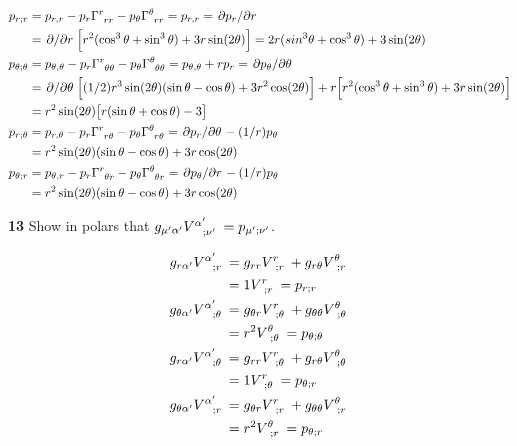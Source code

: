 \documentclass[gr-notes.tex]{subfiles}
\begin{document}
\begin{align*}
  p_{r;r} &=
  p_{r,r} -
  p_r \tensor{\Gamma}{^r_{rr}} -
  p_\theta \tensor{\Gamma}{^\theta_{rr}} =
  p_{r,r} = \pdv*{p_r}{r}
  \\ &=
  \pdv*{r} \qty[ r^2 (\cos^3\theta + \sin^3\theta) + 3 r \sin(2\theta) ] =
  2 r (sin^3\theta + \cos^3\theta) + 3 \sin(2\theta)
  \\
  p_{\theta;\theta} &=
  p_{\theta,\theta} -
  p_r \tensor{\Gamma}{^r_{\theta\theta}} -
  p_\theta \tensor{\Gamma}{^\theta_{\theta\theta}} =
  p_{\theta,\theta} + r p_r =
  \pdv*{p_\theta}{\theta}
  \\ &=
  \pdv*{\theta} \qty[
    (1/2) r^3 \sin(2\theta) (\sin\theta - \cos\theta) +
    3 r^2 \cos(2\theta)
  ] +
  r \qty[
    r^2 (\cos^3\theta + \sin^3\theta) + 3 r \sin(2\theta)
  ]
  \\ &=
  r^2 \sin(2\theta) \qty[ r (\sin\theta + \cos\theta) - 3 ]
  \\
  p_{r;\theta} &=
  p_{r,\theta} -
  p_r \tensor{\Gamma}{^r_{r\theta}} -
  p_\theta \tensor{\Gamma}{^\theta_{r\theta}} =
  \pdv*{p_r}{\theta} - (1/r) p_\theta
  \\ &=
  r^2 \sin(2\theta) (\sin\theta - \cos\theta) + 3 r \cos(2\theta)
  \\
  p_{\theta;r} &=
  p_{\theta,r} -
  p_r \tensor{\Gamma}{^r_{\theta r}} -
  p_\theta \tensor{\Gamma}{^\theta_{\theta r}} =
  \pdv*{p_\theta}{r} - (1/r) p_\theta
  \\ &=
  r^2 \sin(2\theta) (\sin\theta - \cos\theta) + 3 r \cos(2\theta)
\end{align*}


\textbf{13}
Show in polars that $g_{\mu'\alpha'} \tensor{V}{^{\alpha'}_{;\nu'}} = p_{\mu';\nu'}$.

\begin{align*}
  g_{r\alpha'} \tensor{V}{^{\alpha'}_{;r}} &=
  g_{rr} \tensor{V}{^{r}_{;r}} + g_{r\theta} \tensor{V}{^{\theta}_{;r}}
  \\ &=
  1 \tensor{V}{^r_{;r}} =
  p_{r;r}
  \\
  g_{\theta\alpha'} \tensor{V}{^{\alpha'}_{;\theta}} &=
  g_{\theta r} \tensor{V}{^r_{;\theta}} +
  g_{\theta\theta} \tensor{V}{^\theta_{;\theta}}
  \\ &=
  r^2 \tensor{V}{^\theta_{;\theta}} =
  p_{\theta;\theta}
  \\
  g_{r \alpha'} \tensor{V}{^{\alpha'}_{;\theta}} &=
  g_{rr} \tensor{V}{^r_{;\theta}} +
  g_{r\theta} \tensor{V}{^\theta_{;\theta}}
  \\ &=
  1 \tensor{V}{^r_{;\theta}} =
  p_{\theta;r}
  \\
  g_{\theta\alpha'} \tensor{V}{^{\alpha'}_{;r}} &=
  g_{\theta r} \tensor{V}{^r_{;r}} +
  g_{\theta\theta} \tensor{V}{^\theta_{;r}}
  \\ &=
  r^2 \tensor{V}{^\theta_{;r}} =
  p_{\theta;r}
\end{align*}
\end{document}
